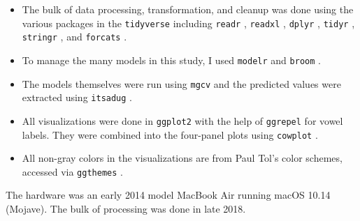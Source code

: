 \begin{itemize}
    \item The bulk of data processing, transformation, and cleanup was done using the various packages in the \texttt{tidyverse} \citep{wickham_2017_tidyverse} including \texttt{readr} \citep{wickham_etal_2018_readr}, \texttt{readxl} \citep{wickham_bryan_2019_readxl}, \texttt{dplyr} \citep{wickham_etal_2019_dplyr}, \texttt{tidyr} \citep{wickham_henry_2018_tidyr}, \texttt{stringr} \citep{wickham_2019_stringr}, and \texttt{forcats} \citep{wickham_2019_forcats}.
    \item To manage the many models in this study, I used \texttt{modelr} \citep{wickham_2019_modelr} and \texttt{broom} \citep{robinson_hayes_2018_broom}.
    \item The models themselves were run using \texttt{mgcv} \citep{wood_2017} and the predicted values were extracted using \texttt{itsadug} \citep{van_rij_etal_2017_itsadug}.
    \item All visualizations were done in \texttt{ggplot2} \citep{wickham_2016_ggplot2} with the help of \texttt{ggrepel} \citep{slowikowsky_2018_ggrepel} for vowel labels. They were combined into the four-panel plots using \texttt{cowplot} \citep{wilke_2019_cowplot}.
    \item All non-gray colors in the visualizations are from Paul Tol's \citeyearpar{tol_2012} color schemes, accessed via \texttt{ggthemes} \citep{arnold_2018_ggthemes}.
\end{itemize}
The hardware was an early 2014 model MacBook Air running macOS 10.14 (Mojave). The bulk of processing was done in late 2018.


